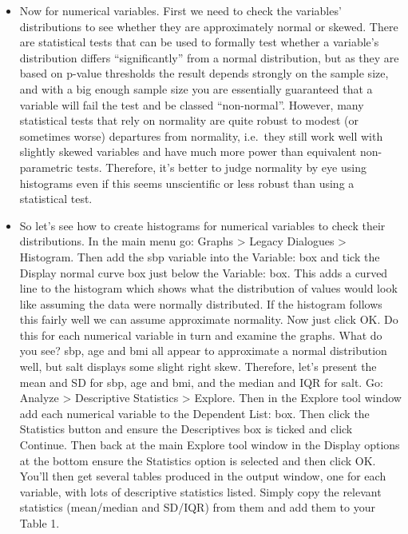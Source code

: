 \documentclass[
]{book}
\begin{document}
\begin{itemize}
\item
  Now for numerical variables. First we need to check the variables' distributions to see whether they are approximately normal or skewed. There are statistical tests that can be used to formally test whether a variable's distribution differs ``significantly'' from a normal distribution, but as they are based on p-value thresholds the result depends strongly on the sample size, and with a big enough sample size you are essentially guaranteed that a variable will fail the test and be classed ``non-normal''. However, many statistical tests that rely on normality are quite robust to modest (or sometimes worse) departures from normality, i.e.~they still work well with slightly skewed variables and have much more power than equivalent non-parametric tests. Therefore, it's better to judge normality by eye using histograms even if this seems unscientific or less robust than using a statistical test.
\item
  So let's see how to create histograms for numerical variables to check their distributions. In the main menu go: Graphs \textgreater{} Legacy Dialogues \textgreater{} Histogram. Then add the sbp variable into the Variable: box and tick the Display normal curve box just below the Variable: box. This adds a curved line to the histogram which shows what the distribution of values would look like assuming the data were normally distributed. If the histogram follows this fairly well we can assume approximate normality. Now just click OK. Do this for each numerical variable in turn and examine the graphs. What do you see? sbp, age and bmi all appear to approximate a normal distribution well, but salt displays some slight right skew. Therefore, let's present the mean and SD for sbp, age and bmi, and the median and IQR for salt. Go: Analyze \textgreater{} Descriptive Statistics \textgreater{} Explore. Then in the Explore tool window add each numerical variable to the Dependent List: box. Then click the Statistics button and ensure the Descriptives box is ticked and click Continue. Then back at the main Explore tool window in the Display options at the bottom ensure the Statistics option is selected and then click OK. You'll then get several tables produced in the output window, one for each variable, with lots of descriptive statistics listed. Simply copy the relevant statistics (mean/median and SD/IQR) from them and add them to your Table 1.
\end{itemize}
\end{document}
